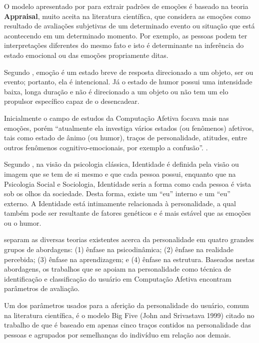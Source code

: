 \documentclass[
    12pt,                   %
    openright,              %
    oneside,                %
    a4paper,                %
    sumario=tradicional,    %
    english,                %
    brazil,                 %
    ]{abntex2}
\begin{document}
O modelo apresentado por  para extrair padrões de emoções é baseado na teoria \textbf{Appraisal}, muito aceita na literatura científica, que considera as emoções como resultado de avaliações subjetivas de um determinado evento ou situação que está acontecendo em um determinado momento. Por exemplo, as pessoas podem ter interpretações diferentes do mesmo fato e isto é determinante na inferência do estado emocional ou das emoções propriamente ditas.

Segundo , emoção é um estado breve de resposta direcionado a um objeto, ser ou evento; portanto, ela é intencional. Já o estado de humor possui uma intensidade baixa, longa duração e não é direcionado a um objeto ou não tem um elo propulsor específico capaz de o desencadear. 

Inicialmente o campo de estudos da Computação Afetiva focava mais nas emoções, porém ``atualmente ela investiga vários estados (ou fenômenos) afetivos, tais como estado de ânimo (ou humor), traços de personalidade, atitudes, entre outros fenômenos cognitivo-emocionais, por exemplo a confusão''. \cite{Jaques2019}. 

Segundo , na visão da psicologia clássica, Identidade é definida pela visão ou imagem que se tem de si mesmo e que cada pessoa possui, enquanto que na Psicologia Social e Sociologia, Identidade seria a forma como cada pessoa é vista sob os olhos da sociedade. Desta forma, existe um ``eu'' interno e um ``eu'' externo. A Identidade está intimamente relacionada à personalidade, a qual também pode ser resultante de fatores genéticos e é mais estável que as emoções ou o humor.

 separam as diversas teorias existentes acerca da personalidade em quatro grandes grupos de abordagens: (1) ênfase na psicodinâmica; (2) ênfase na realidade percebida; (3) ênfase na aprendizagem; e (4) ênfase na estrutura. Baseados nestas abordagens, os trabalhos que se apoiam na personalidade como técnica de identificação e classificação do usuário em Computação Afetiva encontram parâmetros de avaliação.

Um dos parâmetros usados para a aferição da personalidade do usuário, comum na literatura científica, é o modelo Big Five (John and Srivastava 1999) citado no trabalho de  que é baseado em apenas cinco traços contidos na personalidade das pessoas e agrupados por semelhanças do indivíduo em relação aos demais.
\end{document}
